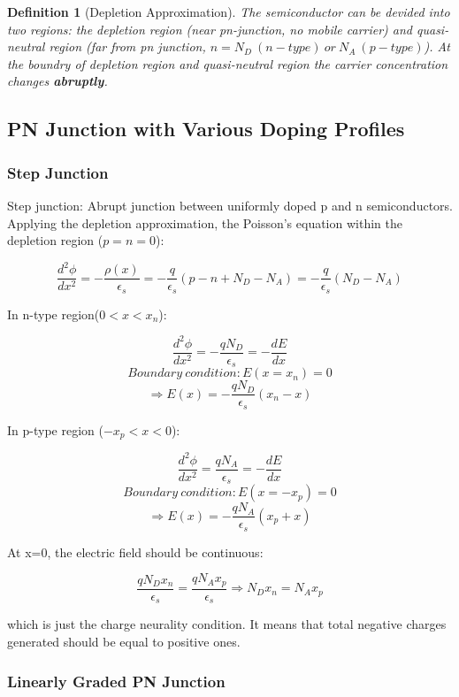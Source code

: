 \documentclass{article}
\newtheorem{thm2}{Definition}
\begin{document}
   \begin{thm2}[Depletion Approximation]
    The semiconductor can be devided into two regions: the depletion region (near pn-junction, no mobile carrier) and quasi-neutral region (far from pn junction, $n = N_D\ (n-type)\ or\ N_A\ (p-type)$). At the boundry of depletion region and quasi-neutral region the carrier concentration changes \textbf{abruptly}.
   \end{thm2}
   
    
    	\subsection{PN Junction with Various Doping Profiles}
    	
    	\subsubsection{Step Junction}
    		
    		 
    		Step junction: Abrupt junction between uniformly doped p and n semiconductors.
    		Applying the depletion approximation, the Poisson's equation within the depletion region ($p=n=0$):
    		
    		\[ \frac{d^2\phi}{dx^2} = -\frac{\rho(x)}{\epsilon_s} =-\frac{q}{\epsilon_s}(p-n+N_D-N_A) = -\frac{q}{\epsilon_s}(N_D-N_A)  \]
    		
    		In n-type region($ 0<x<x_n $):
    		
    		\[
    		\frac{d^2\phi}{dx^2} =-\frac{qN_D}{\epsilon_s}  = -\frac{dE}{dx}
    		\]
    		\[
    		Boundary\ condition: E(x=x_n)=0
    		\]
    		\[
    		\Rightarrow E(x) =- \frac{qN_D}{\epsilon_s} (x_n-x)
    		\]
    		
    		In p-type region ($-x_p<x<0$):
    		
    		\[
    		\frac{d^2\phi}{dx^2} =\frac{qN_A}{\epsilon_s}  = -\frac{dE}{dx}
    		\]
    		\[
    		Boundary\ condition: E(x=-x_p)=0
    		\]
    		\[
    		\Rightarrow E(x) = -\frac{qN_A}{\epsilon_s}(x_p+x)
    		\]
    		
    		At x=0, the electric field should be continuous:
    		
    		\[
    		\frac{qN_Dx_n}{\epsilon_s} =  \frac{qN_Ax_p}{\epsilon_s}
    		\Rightarrow N_Dx_n = N_Ax_p
    		\]
    		
    		which is just the charge neurality condition. It means that total negative charges generated should be equal to positive ones.
    		
    		\subsubsection{Linearly Graded PN Junction}
	
\end{document}
